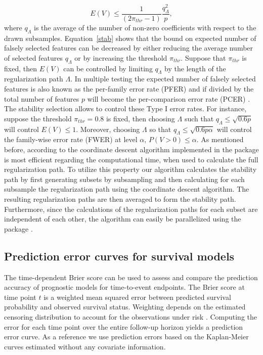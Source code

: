 \documentclass[]{jss}
\begin{document}
\begin{equation}\label{stab}
E(V) \leq \frac{1}{(2\pi_{thr}-1)} \frac{q^{2}_{\Lambda}}{p},
\end{equation}
where $q_{\Lambda}$ is the average of the number of non-zero coefficients with respect to the drawn subsamples.  
Equation~\ref{stab} shows that the bound on expected number of falsely selected features can be decreased by either reducing the average number of selected features $q_{\Lambda}$ or by increasing the threshold $\pi_{thr}$. Suppose that $\pi_{thr}$ is fixed, then $E(V)$ can be controlled by limiting $q_{\Lambda}$ by the length of the regularization path $\Lambda$. In multiple testing the expected number of falsely selected features is also known as the per-family error rate (PFER) and if divided by the total number of features $p$ will become the per-comparison error rate (PCER) \citep{Dudoit2003}. The stability selection allows to control these Type I error rates. For instance, suppose the threshold $\pi_{thr} = 0.8$ is fixed, then choosing $\Lambda$ such that $q_{\Lambda} \leq \sqrt{0.6p}$ will control $E(V)\leq 1$. Moreover, choosing $\Lambda$ so that $q_{\Lambda} \leq \sqrt{0.6p\alpha}$ will control the family-wise error rate (FWER) at level $\alpha$, $P(V>0) \leq \alpha$.
As mentioned before, according to \citet{FHT2010} the coordinate descent algorithm implemented in the  package is most efficient regarding the computational time, when used to calculate the full regularization path. To utilize this property our algorithm calculates the stability path by first generating subsets by subsampling and then calculating for each subsample the regularization path using the coordinate descent algorithm. The resulting regularization paths are then averaged to form the stability path. Furthermore, since the calculations of the regularization paths for each subset are independent of each other, the algorithm can easily be parallelized using the package . %

\subsection{Prediction error curves for survival models}

The time-dependent Brier score \citep{graf99} can be used to assess and compare the prediction accuracy of prognostic models for time-to-event endpoints.
The Brier score at time point $t$ is a weighted mean squared error between predicted survival probability and observed survival status.
Weighting depends on the estimated censoring distribution to account for the observations under risk \citep{gerds2006}. Computing the error for each time point over the entire follow-up horizon yields a prediction error curve. As a reference we use prediction errors based on the Kaplan-Meier curves estimated without any covariate information. 
\end{document}
